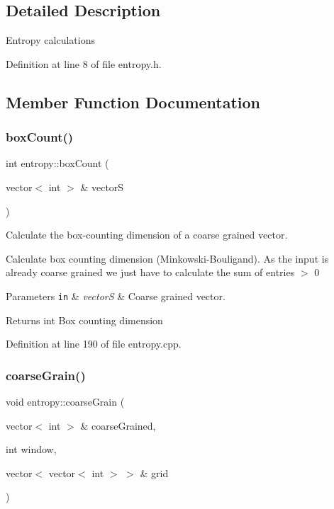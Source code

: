 \subsection{Detailed Description}
Entropy calculations 

Definition at line 8 of file entropy.\+h.



\subsection{Member Function Documentation}
\mbox{\label{classentropy_a253fbd96c15371d3a19658c62a87bcc8}} 
\subsubsection{\texorpdfstring{box\+Count()}{boxCount()}}
{\footnotesize\ttfamily int entropy\+::box\+Count (\begin{DoxyParamCaption}\item[{vector$<$ int $>$ \&}]{vectorS }\end{DoxyParamCaption})}



Calculate the box-\/counting dimension of a coarse grained vector. 

Calculate box counting dimension (Minkowski-\/\+Bouligand). As the input is already coarse grained we just have to calculate the sum of entries $>$ 0 
\begin{DoxyParams}[1]{Parameters}
\mbox{\tt in}  & {\em vectorS} & Coarse grained vector. \\
\hline
\end{DoxyParams}
\begin{DoxyReturn}{Returns}
int Box counting dimension 
\end{DoxyReturn}


Definition at line 190 of file entropy.\+cpp.

\mbox{\label{classentropy_a1a52c035a25b949d699b8e17ffad8559}} 
\subsubsection{\texorpdfstring{coarse\+Grain()}{coarseGrain()}}
{\footnotesize\ttfamily void entropy\+::coarse\+Grain (\begin{DoxyParamCaption}\item[{vector$<$ int $>$ \&}]{coarse\+Grained,  }\item[{int}]{window,  }\item[{vector$<$ vector$<$ int $>$ $>$ \&}]{grid }\end{DoxyParamCaption})}



